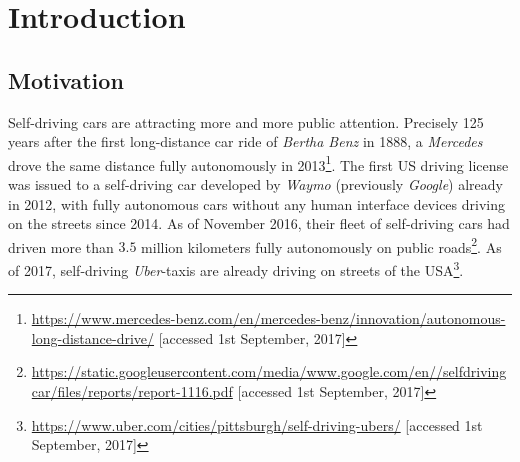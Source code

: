 
\chapter{Introduction} %

\label{ch:intro} %


\newcommand{\keyword}[1]{\textit{#1}}
\newcommand{\tabhead}[1]{\textbf{#1}}
\newcommand{\code}[1]{\texttt{#1}}
\newcommand{\file}[1]{\texttt{\bfseries#1}}
\newcommand{\option}[1]{\texttt{\itshape#1}}
\newcommand{\batchnorm}{batch normalization }
\newcommand{\Batchnorm}{Batch normalization }



\section{Motivation}

Self-driving cars are attracting more and more public attention. Precisely 125 years after the first long-distance car ride of \keyword{Bertha Benz} in 1888, a \keyword{Mercedes} drove the same distance fully autonomously in 2013\footnote{\url{https://www.mercedes-benz.com/en/mercedes-benz/innovation/autonomous-long-distance-drive/} [accessed 1st September, 2017]}.
The first US driving license was issued to a self-driving car developed by \keyword{Waymo} (previously \keyword{Google}) already in 2012, with fully autonomous cars without any human interface devices driving on the streets since 2014. As of November 2016, their fleet of self-driving cars had driven more than $3.5$ million kilometers fully autonomously on public roads\footnote{\url{https://static.googleusercontent.com/media/www.google.com/en//selfdrivingcar/files/reports/report-1116.pdf}  [accessed 1st September, 2017]}. As of 2017, self-driving \keyword{Uber}-taxis are already driving on streets of the USA\footnote{\url{https://www.uber.com/cities/pittsburgh/self-driving-ubers/}  [accessed 1st September, 2017]}. 

